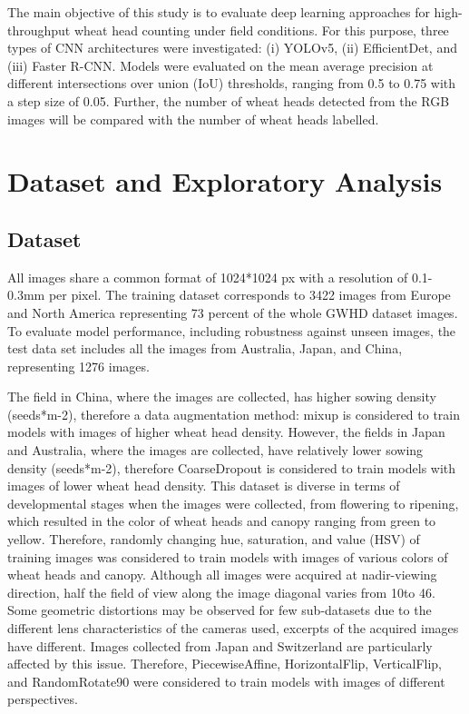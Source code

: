\documentclass[utf8]{frontiersSCNS} %
\begin{document}
\par
The main objective of this study is to evaluate deep learning approaches for high-throughput wheat head counting under field conditions. For this purpose, three types of CNN architectures were investigated: (i) YOLOv5, (ii) EfficientDet, and (iii) Faster R-CNN. Models were evaluated on the mean average precision at different intersections over union (IoU) thresholds, ranging from 0.5 to 0.75 with a step size of 0.05. Further, the number of wheat heads detected from the RGB images will be compared with the number of wheat heads labelled.

\section{Dataset and Exploratory Analysis}
\subsection{Dataset}
All images share a common format of 1024*1024 px with a resolution of 0.1-0.3mm per pixel. The training dataset corresponds to 3422 images from Europe and North America representing 73 percent of the whole GWHD dataset images. To evaluate model performance, including robustness against unseen images, the test data set includes all the images from Australia, Japan, and China, representing 1276 images. 
\par
The field in China, where the images are collected, has higher sowing density (seeds*m-2), therefore a data augmentation method: mixup is considered to train models with images of higher wheat head density. However, the fields in Japan and Australia, where the images are collected, have relatively lower sowing density (seeds*m-2), therefore CoarseDropout is considered to train models with images of lower wheat head density. This dataset is diverse in terms of developmental stages when the images were collected, from flowering to ripening, which resulted in the color of wheat heads and canopy ranging from green to yellow. Therefore, randomly changing hue, saturation, and value (HSV) of training images was considered to train models with images of various colors of wheat heads and canopy. Although all images were acquired at nadir-viewing direction, half the field of view along the image diagonal varies from 10\degree \space to 46\degree. Some geometric distortions may be observed for few sub-datasets due to the different lens characteristics of the cameras used, excerpts of the acquired images have different. Images collected from Japan and Switzerland are particularly affected by this issue. Therefore, PiecewiseAffine, HorizontalFlip, VerticalFlip, and RandomRotate90 were considered to train models with images of different perspectives. 
\end{document}
